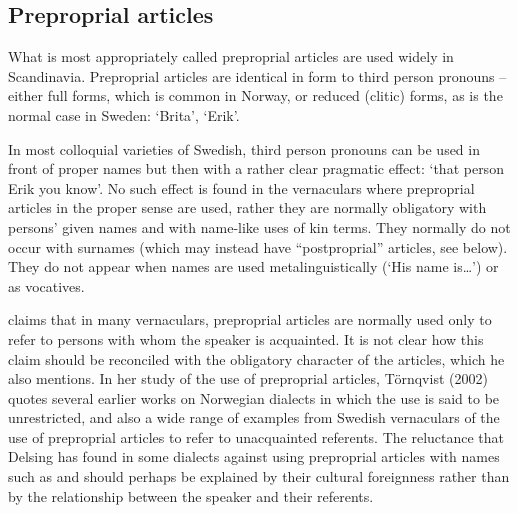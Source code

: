 \z

\subsection{ Preproprial articles}
\label{bkm:Ref224379496}
What is most appropriately called preproprial articles are used widely in Scandinavia. Preproprial articles are identical in form to third person pronouns – either full forms, which is common in Norway, or reduced (clitic) forms, as is the normal case in Sweden:  ‘Brita’, ‘Erik’. 


In most colloquial varieties of Swedish, third person pronouns can be used in front of proper names but then with a rather clear pragmatic effect:  ‘that person Erik you know’. No such effect is found in the vernaculars where preproprial articles in the proper sense are used, rather they are normally obligatory with persons’ given names and with name-like uses of kin terms. They normally do not occur with surnames (which may instead have “postproprial” articles, see below). They do not appear when names are used metalinguistically (‘His name is…’) or as vocatives. 


\citet[21]{Delsing2003a} claims that in many vernaculars, preproprial articles are normally used only to refer to persons with whom the speaker is acquainted. It is not clear how this claim should be reconciled with the obligatory character of the articles, which he also mentions. In her study of the use of preproprial articles, Törnqvist (2002) quotes several earlier works on Norwegian dialects in which the use is said to be unrestricted, and also a wide range of examples from Swedish vernaculars of the use of preproprial articles to refer to unacquainted referents. The reluctance that Delsing has found in some dialects against using preproprial articles with names such as  and  should perhaps be explained by their cultural foreignness rather than by the relationship between the speaker and their referents. 


